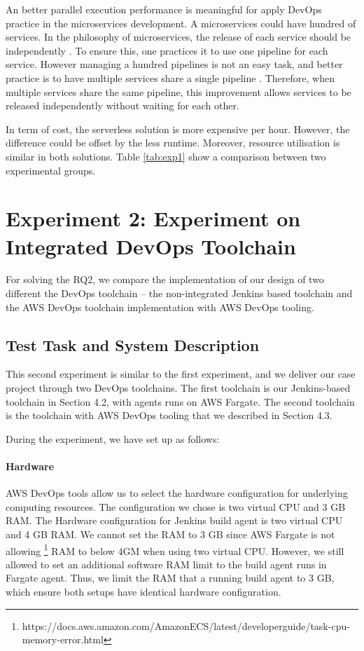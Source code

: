 \label{micros}
An better parallel execution performance is meaningful for apply DevOps practice in the microservices development. A microservices could have hundred of services. In the philosophy of microservices, the release of each service should be independently \cite{dehghani2018break}. To ensure this, one practices it to use one pipeline for each service. However managing a hundred pipelines is not an easy task, and better practice is to have multiple services share a single pipeline \cite{HowtoSca9:online}. Therefore, when multiple services share the same pipeline, this improvement allows services to be released independently without waiting for each other.
\par
In term of cost, the serverless solution is more expensive per hour. However, the difference could be offset by the less runtime. Moreover, resource utilisation is similar in both solutions. Table \ref{tab:exp1} show a comparison between two experimental groups.
\section{Experiment 2: Experiment on Integrated DevOps Toolchain}
For solving the RQ2, we compare the implementation of our design of two different the DevOps toolchain -- the non-integrated Jenkins based toolchain and the AWS DevOps toolchain implementation with AWS DevOps tooling.
\subsection{Test Task and System Description}
This second experiment is similar to the first experiment, and we deliver our case project through two DevOps toolchains. The first toolchain is our Jenkins-based toolchain in Section 4.2, with agents runs on AWS Fargate. The second toolchain is the toolchain with AWS DevOps tooling that we described in Section 4.3.
\par
During the experiment, we have set up as follows:
\paragraph{Hardware}
AWS DevOps tools allow us to select the hardware configuration for underlying computing resources. The configuration we chose is two virtual CPU and 3 GB RAM.
The Hardware configuration for Jenkins build agent is two virtual CPU and 4 GB RAM. We cannot set the RAM to 3 GB since AWS Fargate is not allowing \footnote{https://docs.aws.amazon.com/AmazonECS/latest/developerguide/task-cpu-memory-error.html} RAM to below 4GM when using two virtual CPU. However, we still allowed to set an additional software RAM limit to the build agent runs in Fargate agent. Thus, we limit the RAM that a running build agent to 3 GB, which ensure both setups have identical hardware configuration.

